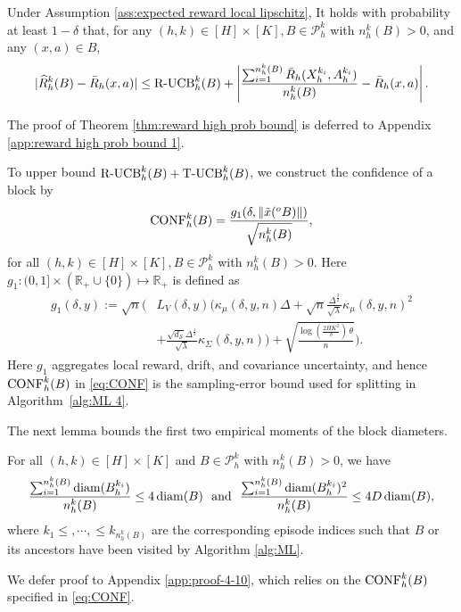 \documentclass[final,supplement]{siamart251216}
\begin{document}
\begin{theorem}\label{thm:reward high prob bound}
Under Assumption \ref{ass:expected reward local lipschitz}, It holds with probability at least $1-\delta$ that, for any  $(h,k) \in [H]\times [K], B\in \mathcal{P}_h^k$ with $n_h^k(B)>0$, and any $(x,a) \in B$, 
\begin{eqnarray}\label{eq:reward high prob bound}
    |\widehat{R}_{h}^{k}(B)-\bar{R}_h(x,a)| \leq \mbox{\rm R-UCB}_{h}^{k}(B)+\left|\frac{\sum_{i=1}^{n_h^k(B)}\bar{R}_{h}(X_{h}^{k_{i}},A_{h}^{k_{i}})}{n_h^k(B)}-\bar{R}_h(x,a)\right|.
\end{eqnarray}
\end{theorem}

The proof of Theorem \ref{thm:reward high prob bound} is deferred to Appendix \ref{app:reward high prob bound 1}.


To upper bound $\mbox{\rm R-UCB}_{h}^{k}(B)+ \mbox{\rm T-UCB}_{h}^{k}(B)$, we construct the confidence of a block  by 
\begin{eqnarray}\label{eq:CONF}
    {\rm CONF}_{h}^{k}(B)=\frac{g_{1}(\delta, \|\tilde{x}(^{o}B)\|)}{\sqrt{n_h^k(B)}},
\end{eqnarray}
for all $ (h,k) \in [H]\times [K], B \in \mathcal{P}_h^k $ with $n_h^k(B)>0$. Here
$g_{1}: (0,1]\times (\mathbb{R}_+\cup\{0\})\mapsto \mathbb{R}_+$ is defined as 
\begin{equation}\label{eq:g1 definition}
\begin{aligned}
g_{1}(\delta,y):=\sqrt{n}\Bigg(&L_{V}(\delta,y)\Bigg(\kappa_{\mu}(\delta,y,n)\Delta
 +\sqrt{n}\frac{\Delta^{\frac{3}{2}}}{\sqrt{\lambda}}\kappa_{\mu}(\delta,y,n)^{2}\\
&+\frac{\sqrt{d_{\mathcal{S}}}\Delta^{\frac{1}{2}}}{\sqrt{\lambda}}\kappa_{\Sigma}(\delta,y,n)\Bigg)
 +\sqrt{\frac{\log(\frac{2HK^{2}}{\delta})\,\theta}{n}}\Bigg).
\end{aligned}
\end{equation}
Here $g_1$ aggregates local reward, drift, and covariance uncertainty, and hence
${\rm CONF}_h^k(B)$ in \eqref{eq:CONF} is the sampling-error bound used for splitting in Algorithm~\ref{alg:ML 4}.

The next lemma bounds the first two empirical moments of the block
diameters.


\begin{lemma}\label{thm:quoted cumulative bound lemma}
 For all $(h,k) \in [H] \times [K]$ and $B \in \mathcal{P}_h^k$ with $n_h^k(B)>0$, we have
\begin{eqnarray}\label{eq:cumulative bound I}
    \frac{\sum_{i=1}^{n_h^k(B)} {\rm diam}(B_{h}^{k_{i}})}{n_h^k(B)} \leq 4 \,{\rm diam}(B)\,\, \mbox{ and }\,\, \frac{\sum_{i=1}^{n_h^k(B)} {\rm diam}(B_{h}^{k_{i}})^{2}}{n_h^k(B)} \leq 4 D\, {\rm diam}(B),
\end{eqnarray}
where $k_{1}\leq ,\cdots, \leq k_{n_h^k(B)}$ are the corresponding episode indices such that $B$ or its ancestors have been visited by Algorithm \ref{alg:ML}. 
\end{lemma}
 We defer proof to Appendix \ref{app:proof-4-10}, which relies on the ${\rm CONF}_{h}^{k}(B)$ specified in \eqref{eq:CONF}.
\end{document}
